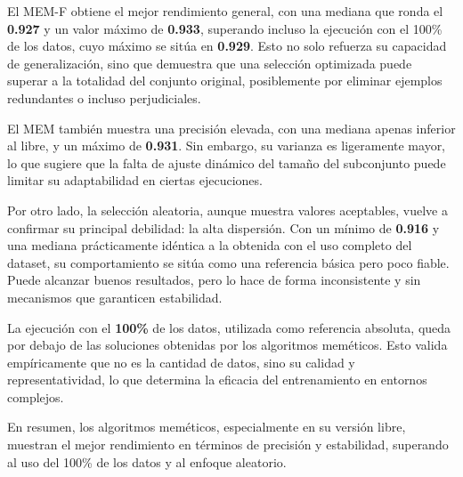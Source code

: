 El MEM-F obtiene el mejor rendimiento general, con una mediana que ronda el \textbf{0.927} y un valor máximo de \textbf{0.933},
superando incluso la ejecución con el 100\% de los datos, cuyo máximo se sitúa en \textbf{0.929}.
Esto no solo refuerza su capacidad de generalización, sino que demuestra que una selección optimizada puede superar a la totalidad del conjunto original,
posiblemente por eliminar ejemplos redundantes o incluso perjudiciales.

El MEM también muestra una precisión elevada, con una mediana apenas inferior al libre, y un máximo de \textbf{0.931}.
Sin embargo, su varianza es ligeramente mayor, lo que sugiere que la falta de ajuste dinámico del tamaño del subconjunto puede limitar su adaptabilidad en ciertas ejecuciones.

Por otro lado, la selección aleatoria, aunque muestra valores aceptables, vuelve a confirmar su principal debilidad: la alta dispersión.
Con un mínimo de \textbf{0.916} y una mediana prácticamente idéntica a la obtenida con el uso completo del dataset,
su comportamiento se sitúa como una referencia básica pero poco fiable.
Puede alcanzar buenos resultados, pero lo hace de forma inconsistente y sin mecanismos que garanticen estabilidad.

La ejecución con el \textbf{100\%} de los datos, utilizada como referencia absoluta, queda por debajo de las soluciones obtenidas por los algoritmos meméticos.
Esto valida empíricamente que no es la cantidad de datos, sino su calidad y representatividad, lo que determina la eficacia del entrenamiento en entornos complejos.

En resumen, los algoritmos meméticos, especialmente en su versión libre, muestran el mejor rendimiento en términos de precisión y estabilidad,
superando al uso del 100\% de los datos y al enfoque aleatorio.

